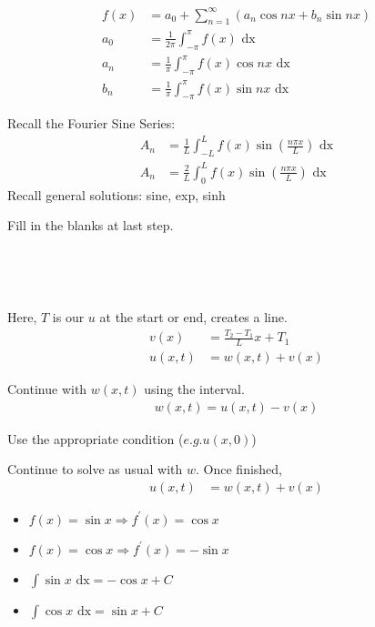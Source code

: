 \documentclass{article}
\begin{document}
\begin{multicols}{2}
  \begin{align*}
    f(x) & =
    a_0 +
    \sum^\infty_{n = 1}
    (a_n \cos nx + b_n \sin nx)\\
    a_0 & =
    \frac{1}{2 \pi}
    \int^\pi_{-\pi}
    f(x)
    \text{ dx}\\
    a_n & =
    \frac{1}{\pi}
    \int^\pi_{-\pi}
    f(x) \cos nx
    \text{ dx}\\
    b_n & =
    \frac{1}{\pi}
    \int^\pi_{-\pi}
    f(x) \sin nx
    \text{ dx}
  \end{align*}

Recall the Fourier Sine Series:
\begin{align*}
  A_n & = \frac{1}{L}\int^L_{-L} f(x) \sin\left(\frac{n \pi x}{L}\right)\text{ dx}\\
  A_n & = \frac{2}{L}\int^L_0 f(x) \sin\left(\frac{n \pi x}{L}\right)\text{ dx}
\end{align*}
Recall general solutions: sine, exp, sinh

Fill in the blanks at last step.

\

\


Here, $T$ is our $u$ at the start or end, creates a line.
\begin{align*}
  v(x) & = \frac{T_2 - T_1}{L}x + T_1\\
  u(x, t) & = w(x, t) + v(x)
\end{align*}

Continue with $w(x, t)$ using the interval.
\begin{align*}
  w(x, t) = u(x, t) - v(x)
\end{align*}

Use the appropriate condition ($e.g. u(x, 0)$)

Continue to solve as usual with $w$. Once finished,
\begin{align*}
  u(x, t) & = w(x, t) + v(x)
\end{align*}

\begin{itemize}
  \item $f(x) = \sin x \Rightarrow f^\prime(x) =   \cos x$
  \item $f(x) = \cos x \Rightarrow f^\prime(x) = - \sin x$
  \item $\int \sin x \text{ dx} = - \cos x + C$
  \item $\int \cos x \text{ dx} =   \sin x + C$
\end{itemize}


\end{multicols}
\end{document}
